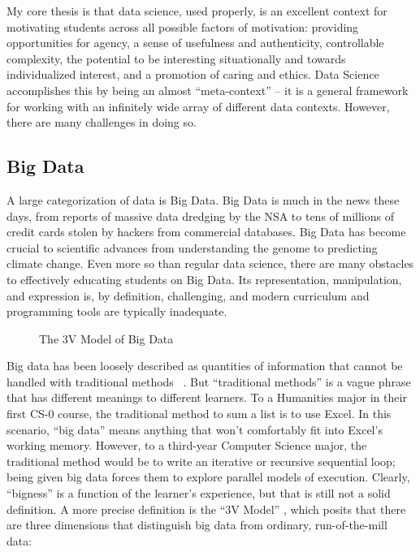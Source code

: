 My core thesis is that data science, used properly, is an excellent context for motivating students across all possible factors of motivation: providing opportunities for agency, a sense of usefulness and authenticity, controllable complexity, the potential to be interesting situationally and towards individualized interest, and a promotion of caring and ethics.
Data Science accomplishes this by being an almost ``meta-context'' -- it is a general framework for working with an infinitely wide array of different data contexts.
However, there are many challenges in doing so.

\subsection{Big Data}

A large categorization of data is Big Data. Big Data is much in the news these days, from reports of massive data
dredging by the NSA to tens of millions of credit cards stolen by
hackers from commercial databases.
Big Data has become crucial to scientific advances from understanding the
genome to predicting climate change.
Even more so than regular data science, there are many obstacles to effectively educating students on Big
Data.
Its representation, manipulation, and expression is, by definition, challenging, and modern curriculum and programming tools are typically inadequate.

\begin{wrapfigure}{r}{0.5\textwidth}
    \begin{center}
    \end{center}
    \vspace{-\bigskipamount}
    \caption{The 3V Model of Big Data}
    \label{fig-3v}
\end{wrapfigure}

Big data has been loosely described as quantities of information that cannot be handled with traditional methods ~\cite{McKinsey}.
But ``traditional methods'' is a vague phrase that has different meanings to different learners. To a Humanities major in their first CS-0 course, the traditional method to sum a list is to use Excel. In this scenario, ``big data'' means anything that won't comfortably fit into Excel's working memory.
However, to a third-year Computer Science major, the traditional method would be to write an iterative or recursive sequential loop; being given big data forces them to explore parallel models of execution.
Clearly, ``bigness'' is a function of the learner's experience, but that is still not a solid definition.
A more precise definition is the ``3V Model'' \cite{douglas2012importance}, which posits that there are three dimensions that distinguish big data from ordinary, run-of-the-mill data:

